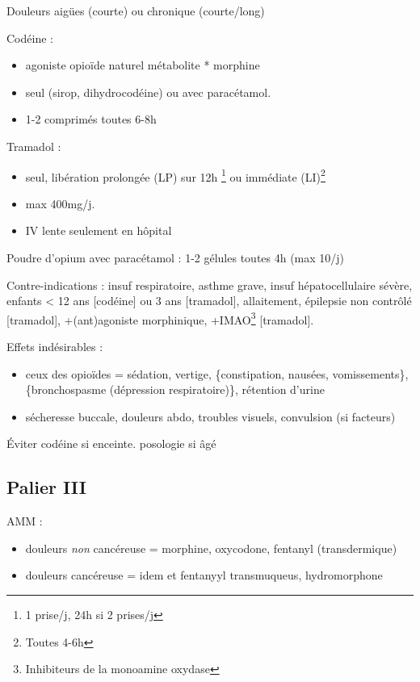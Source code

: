 \documentclass[11pt]{article}
\begin{document}

Douleurs aigües (courte) ou chronique (courte/long)

Codéine : 
\begin{itemize}
\item agoniste opioïde naturel \thus métabolite * morphine
\item seul (sirop, dihydrocodéine) ou avec paracétamol.
\item 1-2 comprimés toutes 6-8h
\end{itemize}

Tramadol : 
\begin{itemize}
\item seul, libération prolongée (LP) sur 12h \footnote{1 prise/j, 24h si 2 prises/j} ou immédiate (LI)\footnote{Toutes 4-6h}
\item max 400mg/j.
\item IV lente seulement en hôpital
\end{itemize}

Poudre d'opium avec paracétamol : 1-2 gélules toutes 4h (max 10/j)

Contre-indications : insuf respiratoire, asthme grave, insuf hépatocellulaire
sévère, enfants < 12 ans [codéine] ou 3 ans [tramadol], allaitement, épilepsie
non contrôlé [tramadol], +(ant)agoniste morphinique, +IMAO\footnote{Inhibiteurs de la monoamine oxydase} [tramadol].

Effets indésirables :
\begin{itemize}
\item ceux des opioïdes = sédation, vertige, \{constipation, nausées, vomissements\},
\{bronchospasme (dépression respiratoire)\}, rétention d'urine
\item sécheresse buccale, douleurs abdo, troubles visuels, convulsion (si facteurs)
\end{itemize}

Éviter codéine si enceinte. \dec posologie si âgé

\subsection{Palier III}
\label{sec:org00742ff}
AMM : 
\begin{itemize}
\item douleurs \emph{non} cancéreuse = morphine, oxycodone, fentanyl (transdermique)
\item douleurs cancéreuse = idem et fentanyyl transmuqueus, hydromorphone
\end{itemize}
\end{document}
